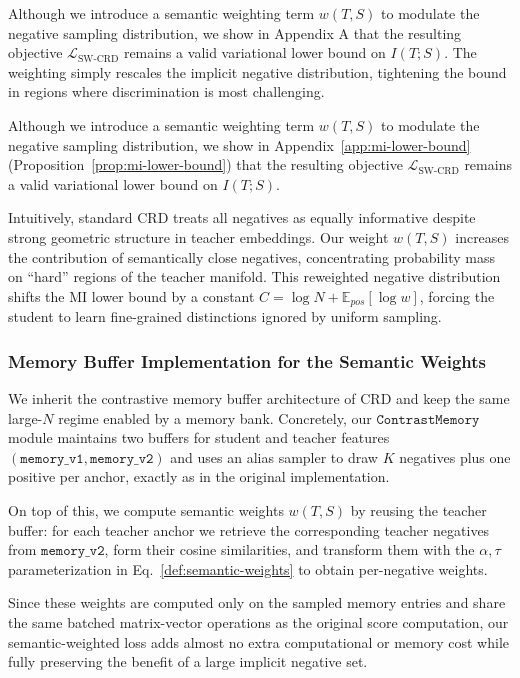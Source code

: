 \documentclass{article}
\theoremstyle{plain}
\theoremstyle{remark}
\begin{document}
Although we introduce a semantic weighting term $w(T,S)$ to modulate the negative sampling distribution, we show in Appendix A that the resulting objective $\mathcal{L}_{\text{SW-CRD}}$ remains a valid variational lower bound on $I(T;S)$. The weighting simply rescales the implicit negative distribution, tightening the bound in regions where discrimination is most challenging.

Although we introduce a semantic weighting term $w(T,S)$ to modulate the negative sampling distribution, we show in Appendix~\ref{app:mi-lower-bound} (Proposition~\ref{prop:mi-lower-bound}) that the resulting objective $\mathcal{L}_{\text{SW-CRD}}$ remains a valid variational lower bound on $I(T;S)$.

Intuitively, standard CRD treats all negatives as equally informative despite strong geometric structure in teacher embeddings. Our weight $w(T,S)$ increases the contribution of semantically close negatives, concentrating probability mass on “hard” regions of the teacher manifold. This reweighted negative distribution shifts the MI lower bound by a constant $C = \log N + \mathbb{E}_{pos}[\log w]$, forcing the student to learn fine-grained distinctions ignored by uniform sampling.


\subsubsection{Memory Buffer Implementation for the Semantic Weights}
We inherit the contrastive memory buffer architecture of CRD \citep{crd_tian2022crd} and keep the same large-$N$ regime enabled by a memory bank. Concretely, our $\texttt{ContrastMemory}$ module maintains two buffers for student and teacher features $(\texttt{memory\_v1}, \texttt{memory\_v2})$ and uses an alias sampler to draw $K$ negatives plus one positive per anchor, exactly as in the original implementation.

On top of this, we compute semantic weights $w(T,S)$ by reusing the teacher buffer: for each teacher anchor we retrieve the corresponding teacher negatives from $\texttt{memory\_v2}$, form their cosine similarities, and transform them with the $\alpha,\tau$ parameterization in Eq.~\ref{def:semantic-weights} to obtain per-negative weights.

Since these weights are computed only on the sampled memory entries and share the same batched matrix-vector operations as the original score computation, our semantic-weighted loss adds almost no extra computational or memory cost while fully preserving the benefit of a large implicit negative set.
\end{document}
